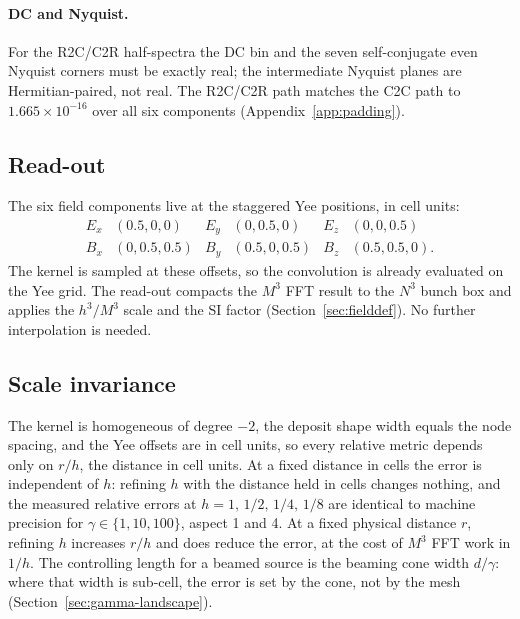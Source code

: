 \paragraph{DC and Nyquist.}
For the R2C/C2R half-spectra the DC bin and the seven self-conjugate even
Nyquist corners must be exactly real; the intermediate Nyquist planes are
Hermitian-paired, not real. The R2C/C2R path matches the C2C path to
$1.665\times10^{-16}$ over all six components
(Appendix~\ref{app:padding}).

\subsection{Read-out}
\label{sec:readout}

The six field components live at the staggered Yee positions, in cell
units:
\begin{equation}
\begin{array}{llllll}
E_x & (0.5,0,0) & E_y & (0,0.5,0) & E_z & (0,0,0.5)\\
B_x & (0,0.5,0.5) & B_y & (0.5,0,0.5) & B_z & (0.5,0.5,0).
\end{array}
\end{equation}
The kernel is sampled at these offsets, so the convolution is already
evaluated on the Yee grid. The read-out compacts the $M^3$ FFT result to the
$N^3$ bunch box and applies the $h^3/M^3$ scale and the SI factor
(Section~\ref{sec:fielddef}). No further interpolation is needed.

\subsection{Scale invariance}
\label{sec:scaleinvariance}

The kernel is homogeneous of degree $-2$, the deposit shape width equals the
node spacing, and the Yee offsets are in cell units, so every relative metric
depends only on $r/h$, the distance in cell units. At a fixed distance in
cells the error is independent of $h$: refining $h$ with the distance held in
cells changes nothing, and the measured relative errors at
$h=1,\,1/2,\,1/4,\,1/8$ are identical to machine precision for
$\gamma\in\{1,10,100\}$, aspect 1 and 4. At a fixed physical distance $r$,
refining $h$ increases $r/h$ and does reduce the error, at the cost of
$M^{3}$ FFT work in $1/h$. The controlling length for a beamed source is the
beaming cone width $d/\gamma$: where that width is sub-cell, the error is set
by the cone, not by the mesh (Section~\ref{sec:gamma-landscape}).

